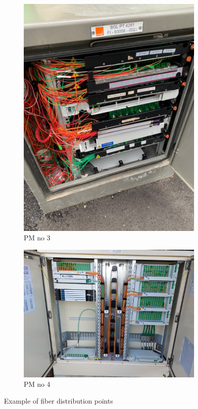 \begin{figure}[H]
\begin{subfigure}{0.3\textwidth}
        \includegraphics[width=\linewidth]{images/pm_example_3.jpg}
        \caption{PM no 3}
    \end{subfigure}
    \begin{subfigure}{0.5\textwidth}
        \includegraphics[width=\linewidth]{images/pm_example_4.jpg}
        \caption{PM no 4}
    \end{subfigure}
    \caption{Example of fiber distribution points}
    \label{fig:pm}
\end{figure}

